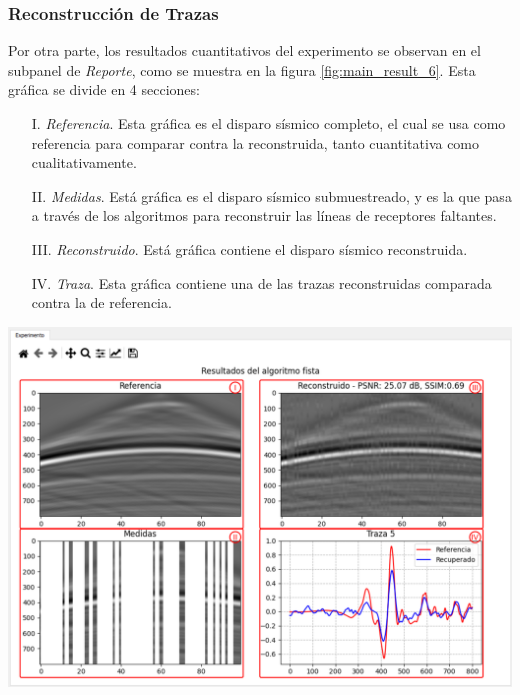 \documentclass[12pt,twoside,letter]{ol-softwaremanual}
\newenvironment{Figure}
  {\par\medskip\noindent\minipage{\linewidth}}
  {\endminipage\par\medskip}
\begin{document}
\subsubsection{Reconstrucción de Trazas}

Por otra parte, los resultados cuantitativos del experimento se observan en el subpanel de \emph{Reporte}, como se muestra en la figura \ref{fig:main_result_6}. Esta gráfica se divide en 4 secciones:

\begin{itemize}[leftmargin=0.5in]
	\setlength\itemsep{0em}
    \item[I.]  \textit{Referencia}. Esta gráfica es el disparo sísmico completo, el cual se usa como referencia para comparar contra la reconstruida, tanto cuantitativa como cualitativamente.
    
    \item[II.] \textit{Medidas}. Está gráfica es el disparo sísmico submuestreado, y es la que pasa a través de los algoritmos para reconstruir las líneas de receptores faltantes.
    
    \item[III.] \textit{Reconstruido}. Está gráfica contiene el disparo sísmico reconstruida.
    
    \item[IV.] \textit{Traza}. Esta gráfica contiene una de las trazas reconstruidas comparada contra la de referencia.
    
\end{itemize}

\begin{Figure}
    \centering
    \includegraphics[width=1\linewidth]{main-result-6.png}
    \label{fig:main_result_6}
\end{Figure}
\end{document}
